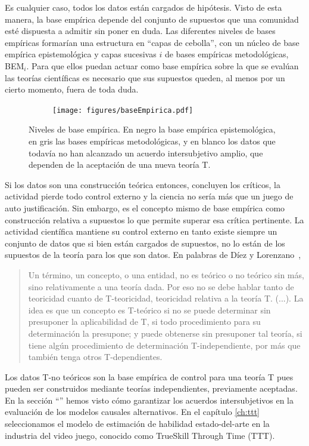 \documentclass[a4paper,10pt]{book}
\theoremstyle{definition}
\begin{document}
Es cualquier caso, todos los datos est\'an cargados de hip\'otesis.
%
Visto de esta manera, la base empírica depende del conjunto de supuestos que una comunidad esté dispuesta a admitir sin poner en duda.
%
Las diferentes niveles de bases empíricas formarían una estructura en ``capas de cebolla'', con un n\'ucleo de base empírica epistemológica y capas sucesivas $i$ de bases empíricas metodológicas, BEM$_i$. 
%
Para que ellos puedan actuar como base emp\'irica sobre la que se eval\'uan las teor\'ias cient\'ificas es necesario que sus supuestos queden, al menos por un cierto momento, fuera de toda duda.
%
\begin{figure}[ht!]
    \centering
    \begin{subfigure}[b]{0.48\textwidth}
    \texttt{[image: figures/baseEmpirica.pdf]}
    \end{subfigure}
    \caption{Niveles de base emp\'irica. En negro la base emp\'irica epistemol\'ogica, en gris las bases emp\'iricas metodol\'ogicas, y en blanco los datos que todav\'ia no han alcanzado un acuerdo intersubjetivo amplio, que dependen de la aceptación de una nueva teoría T. }
\end{figure}


Si los datos son una construcción teórica entonces, concluyen los críticos, la actividad pierde todo control externo y la ciencia no sería más que un juego de auto justificación.
%
Sin embargo, es el concepto mismo de base empírica como construcción relativa a supuestos lo que permite superar esa crítica pertinente.
%
La actividad científica mantiene su control externo en tanto existe siempre un conjunto de datos que si bien están cargados de supuestos, no lo están de los supuestos de la teoría para los que son datos.
%
En palabras de Díez y Lorenzano~\cite{lorenzano2002-concepcionEstructuralista},
%
\begin{quotation}
Un término, un concepto, o una entidad, no es teórico o no teórico sin más, sino relativamente a una teoría dada.
Por eso no se debe hablar tanto de teoricidad cuanto de T-teoricidad, teoricidad relativa a la teoría T. (...).
La idea es que un concepto es T-teórico si no se puede determinar sin presuponer la aplicabilidad de T, si todo procedimiento para su determinación la presupone; y puede obtenerse sin presuponer tal teoría, si tiene alg\'un procedimiento de determinación T-independiente, por más que también tenga otros T-dependientes.
\end{quotation}
%
Los datos T-no teóricos son la base empírica de control para una teoría T pues pueden ser construidos mediante teorías independientes, previamente aceptadas.
%
En la secci\'on ``'' hemos visto c\'omo garantizar los acuerdos intersubjetivos en la evaluación de los modelos causales alternativos.
%
En el cap\'itulo \ref{ch:ttt} seleccionamos el modelo de estimaci\'on de habilidad estado-del-arte en la industria del video juego, conocido como TrueSkill Through Time (TTT).
\end{document}
